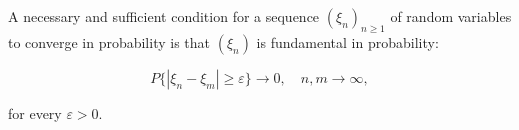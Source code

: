 A necessary and sufficient condition for a sequence $(\xi_n)_{n \geq 1}$ of random variables to converge in probability is that $(\xi_n)$ is fundamental in probability:

$$P\{|\xi_n - \xi_m| \geq \varepsilon\} \to 0, \quad n, m \to \infty,$$

for every $\varepsilon > 0$.
